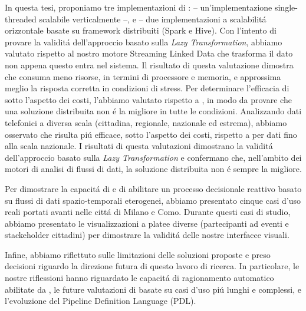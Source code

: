 \sloppy
In questa tesi, proponiamo tre implementazioni di \river{}: \sti{} -- un'implementazione single-threaded scalabile verticalmente --, \sparkdi{} e \hivedi{} -- due implementazioni a scalabilit\'a orizzontale basate su framework distribuiti (Spark e Hive).
Con l'intento di provare la validit\'a dell'approccio basato sulla \textit{Lazy Transformation}, abbiamo valutato \sti{} rispetto al nostro motore Streaming Linked Data che trasforma il dato non appena questo entra nel sistema. Il risultato di questa valutazione dimostra che \sti{} consuma meno risorse, in termini di processore e memoria, e approssima meglio la risposta corretta in condizioni di stress.
Per determinare l'efficacia di \sti{} sotto l'aspetto dei costi, l'abbiamo valutato rispetto a \sparkdi{}, in modo da provare che una soluzione distribuita non \'e la migliore in tutte le condizioni.
Analizzando dati telefonici a diversa scala (cittadina, regionale, nazionale ed estrema), abbiamo osservato che \sti{} risulta pi\'u efficace, sotto l'aspetto dei costi, rispetto a \sparkdi{} per dati fino alla scala nazionale.
I risultati di questa valutazioni dimostrano la validit\'a dell'approccio basato sulla \textit{Lazy Transformation} e confermano che, nell'ambito dei motori di analisi di flussi di dati, la soluzione distribuita non \'e sempre la migliore.

Per dimostrare la capacit\'a di \frappe{} e \river{} di abilitare un processo decisionale reattivo basato su flussi di dati spazio-temporali eterogenei, abbiamo presentato cinque casi d'uso reali portati avanti nelle citt\'a di Milano e Como. Durante questi casi di studio, abbiamo presentato le visualizzazioni a platee diverse (partecipanti ad eventi e stackeholder cittadini) per dimostrare la validit\'a delle nostre interfacce visuali.

Infine, abbiamo riflettuto sulle limitazioni delle soluzioni proposte e preso decisioni riguardo la direzione futura di questo lavoro di ricerca.
In particolare, le nostre riflessioni hanno riguardato le capacit\'a di ragionamento automatico abilitate da \frappe{}, le future valutazioni di \river{} basate su casi d'uso pi\'u lunghi e complessi, e l'evoluzione del Pipeline Definition Language (PDL).